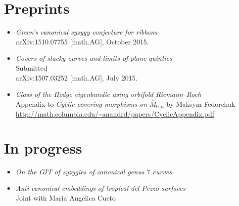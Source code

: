 \documentclass[12pt]{amsart}
\begin{document}
\section{Preprints}

\begin{itemize}
    \setlength{\itemsep}{.5em}

\item
  {\em Green's canonical syzygy conjecture for ribbons}\\
  {arXiv:1510.07755 [math.AG]}, October 2015.
  
\item
  {\em Covers of stacky curves and limits of plane quintics}\\
  Submitted\\
  {arXiv:1507.03252 [math.AG]}, July 2015.

\item
  {\em Class of the Hodge eigenbundle using orbifold Riemann--Roch}\\
  {Appendix to {\em Cyclic covering morphisms on $\overline {M}_{0,n}$} by Maksym Fedorchuk}\\
  \href{http://math.columbia.edu/~anandrd/papers/CyclicAppendix.pdf}{http://math.columbia.edu/\textasciitilde anandrd/papers/CyclicAppendix.pdf}

\end{itemize}

\section{In progress}
\begin{itemize}
    \setlength{\itemsep}{.5em}

  \item
   {\em On the {GIT} of syzygies of canonical genus $7$ curves}\\

\item
  {\em Anti-canonical embeddings of tropical del Pezzo surfaces}\\
  Joint with Maria Angelica Cueto

\end{itemize}



% 
% 
\end{document}
